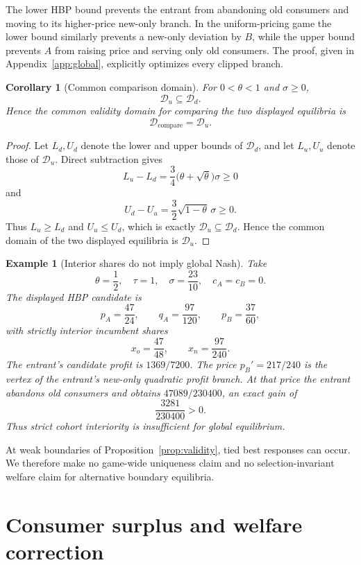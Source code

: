 \documentclass[11pt]{article}
\newtheorem{corollary}{Corollary}
\newtheorem{example}{Example}
\begin{document}
The lower HBP bound prevents the entrant from abandoning old consumers and
moving to its higher-price new-only branch. In the uniform-pricing game the
lower bound similarly prevents a new-only deviation by $B$, while the upper
bound prevents $A$ from raising price and serving only old consumers. The
proof, given in Appendix~\ref{app:global}, explicitly optimizes every clipped
branch.

\begin{corollary}[Common comparison domain]
\label{cor:containment}
For $0<\theta<1$ and $\sigma\geq0$,
\[
  \mathcal D_u\subseteq \mathcal D_d.
\]
Hence the common validity domain for comparing the two displayed equilibria is
\[
  \mathcal D_{\mathrm{compare}}=\mathcal D_u.
\]
\end{corollary}

\begin{proof}
Let $L_d,U_d$ denote the lower and upper bounds of $\mathcal D_d$, and let
$L_u,U_u$ denote those of $\mathcal D_u$.  Direct subtraction gives
\[
 L_u-L_d
 =\frac34\bigl(\theta+\sqrt{\theta}\bigr)\sigma\geq0
\]
and
\[
 U_d-U_u
 =\frac32\sqrt{1-\theta}\,\sigma\geq0.
\]
Thus $L_u\geq L_d$ and $U_u\leq U_d$, which is exactly
$\mathcal D_u\subseteq\mathcal D_d$.  Hence the common domain of the two
displayed equilibria is $\mathcal D_u$.
\end{proof}

\begin{example}[Interior shares do not imply global Nash]
\label{ex:hbp}
Take
\[
 \theta=\frac12,\quad \tau=1,\quad \sigma=\frac{23}{10},
 \quad c_A=c_B=0.
\]
The displayed HBP candidate is
\[
 p_A=\frac{47}{24},\qquad
 q_A=\frac{97}{120},\qquad
 p_B=\frac{37}{60},
\]
with strictly interior incumbent shares
\[
 x_o=\frac{47}{48},\qquad x_n=\frac{97}{240}.
\]
The entrant's candidate profit is $1369/7200$.  The price
$p_B'=217/240$ is the vertex of the entrant's new-only quadratic profit branch.
At that price the entrant abandons old consumers and obtains
$47089/230400$, an exact gain of
\[
 \frac{3281}{230400}>0.
\]
Thus strict cohort interiority is insufficient for global equilibrium.
\end{example}

At weak boundaries of Proposition~\ref{prop:validity}, tied best responses can
occur. We therefore make no game-wide uniqueness claim and no
selection-invariant welfare claim for alternative boundary equilibria.

\section{Consumer surplus and welfare correction}
\end{document}
